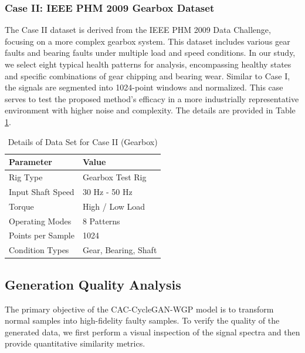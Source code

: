 \subsubsection{Case II: IEEE PHM 2009 Gearbox Dataset}
The Case II dataset is derived from the IEEE PHM 2009 Data Challenge, focusing on a more complex gearbox system. This dataset includes various gear faults and bearing faults under multiple load and speed conditions. In our study, we select eight typical health patterns for analysis, encompassing healthy states and specific combinations of gear chipping and bearing wear. Similar to Case I, the signals are segmented into 1024-point windows and normalized. This case serves to test the proposed method's efficacy in a more industrially representative environment with higher noise and complexity. The details are provided in Table \ref{tab:case2_details}.

\begin{table}[htbp]
\centering
\caption{Details of Data Set for Case II (Gearbox)}
\label{tab:case2_details}
\begin{tabular}{ll}
\hline
\textbf{Parameter} & \textbf{Value} \\ \hline
Rig Type & Gearbox Test Rig \\
Input Shaft Speed & 30 Hz - 50 Hz \\
Torque & High / Low Load \\
Operating Modes & 8 Patterns \\
Points per Sample & 1024 \\
Condition Types & Gear, Bearing, Shaft \\
\hline
\end{tabular}
\end{table}

\subsection{Generation Quality Analysis}
The primary objective of the CAC-CycleGAN-WGP model is to transform normal samples into high-fidelity faulty samples. To verify the quality of the generated data, we first perform a visual inspection of the signal spectra and then provide quantitative similarity metrics.

